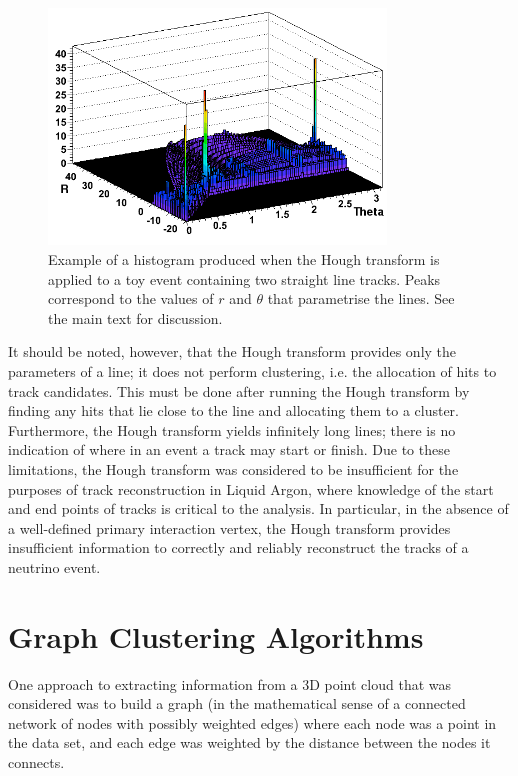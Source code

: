 \begin{figure}
    \centering
    \includegraphics[width=0.8\textwidth]{chapters/otheralg_images/hough-histogram}
    \caption[Hough transform applied to two-track event]{\label{fig:hough_histogram}Example of a histogram produced when the Hough transform is applied to a toy event containing two straight line tracks. Peaks correspond to the values of $r$ and $\theta$ that parametrise the lines. See the main text for discussion.}
\end{figure}

It should be noted, however, that the Hough transform provides only the parameters of a line; it does not perform clustering, i.e. the allocation of hits to track candidates. This must be done after running the Hough transform by finding any hits that lie close to the line and allocating them to a cluster. Furthermore, the Hough transform yields infinitely long lines; there is no indication of where in an event a track may start or finish. Due to these limitations, the Hough transform was considered to be insufficient for the purposes of track reconstruction in Liquid Argon, where knowledge of the start and end points of tracks is critical to the analysis. In particular, in the absence of a well-defined primary interaction vertex, the Hough transform provides insufficient information to correctly and reliably reconstruct the tracks of a neutrino event.

\section{Graph Clustering Algorithms}
One approach to extracting information from a 3D point cloud that was considered was to build a graph (in the mathematical sense of a connected network of nodes with possibly weighted edges) where each node was a point in the data set, and each edge was weighted by the distance between the nodes it connects.

